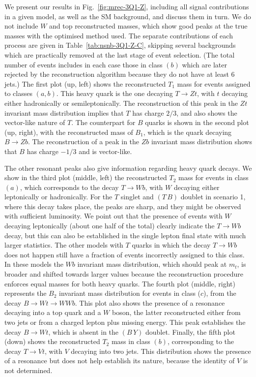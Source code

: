 \documentclass[12pt,a4paper]{article}
\newcommand{\HZ}{V}
\newcommand{\TB}{(T \, B)}
\newcommand{\BY}{(B \, Y)}
\begin{document}
We present our results in Fig.~\ref{fig:mrec-3Q1-Z}, including all signal contributions in a given model, as well as the SM background, and discuss them in turn.
We do not include $W$ and top reconstructed masses, which show good peaks at the true masses with the optimised method used.
The separate contributions of each process are given in Table~\ref{tab:nsnb-3Q1-Z-C}, skipping several backgrounds which are practically removed at the last stage of event selection. (The total number of events includes in each case those in class $(b)$ which are later rejected by the reconstruction algorithm because they do not have at least 6 jets.)
The first plot (up, left) shows the reconstructed $T_1$ mass for events assigned to classes $(a,b)$. This heavy quark is the one decaying $T \to Zt$, with $t$ decaying either hadronically or semileptonically. The reconstruction of this peak in the $Zt$ invariant mass distribution implies that $T$ has charge $2/3$, and also shows the vector-like nature of $T$. The counterpart for $B$ quarks is shown in the second plot (up, right), with the reconstructed mass of  $B_1$, which is the quark decaying $B \to Zb$. The reconstruction of a peak in the $Zb$ invariant mass distribution shows that $B$ has charge $-1/3$ and is vector-like.

The other resonant peaks also give information regarding heavy quark decays. We show in the third plot (middle, left) the reconstructed $T_2$ mass for events in class $(a)$, which corresponds to the decay $T \to Wb$, with $W$ decaying either leptonically or hadronically. For the $T$ singlet and $\TB$ doublet in scenario 1, where this decay takes place, the peaks are sharp, and they might be observed with sufficient luminosity. We point out that the presence of events with $W$ decaying leptonically (about one half of the total) clearly indicate the $T \to Wb$ decay, but this can also be established in the single lepton final state with much larger statistics. The other models with $T$ quarks in which the decay $T \to Wb$ does not happen still have a fraction of events incorrectly assigned to this class. In these models the $Wb$ invariant mass distribution, which should peak at $m_t$, is broader and shifted towards larger values because the reconstruction procedure enforces equal masses for both heavy quarks.  The fourth plot (middle, right) represents the $B_2$ invariant mass distribution for events in class ($c$), from the decay $B \to Wt \to WWb$. This plot also shows the presence of a resonance decaying into a top quark and a $W$ boson, the latter reconstructed either from two jets or from a charged lepton plus missing energy. This peak establishes the decay $B \to Wt$, which is absent in the $\BY$ doublet. Finally, the fifth plot (down) shows the reconstructed $T_2$ mass in class $(b)$, corresponding to the decay $T \to \HZ t$, with $\HZ$ decaying into two jets. This distribution shows the presence of a resonance but does not help establish its nature, because the identity of $\HZ$ is not determined. 
\end{document}
